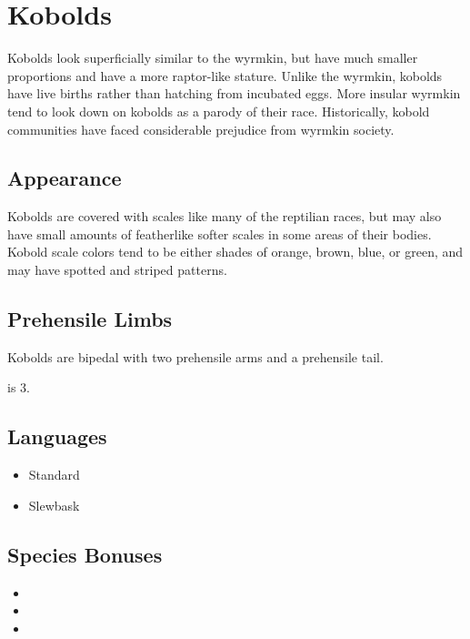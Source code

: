 {\GRPpagebreak
\section{Kobolds}

Kobolds look superficially similar to the wyrmkin, but have much smaller proportions and have a more raptor-like stature. Unlike the wyrmkin, kobolds have live births rather than hatching from incubated eggs. More insular wyrmkin tend to look down on kobolds as a parody of their race. Historically, kobold communities have faced considerable prejudice from wyrmkin society.

\subsection*{Appearance}

Kobolds are covered with scales like many of the reptilian races, but may also have small amounts of featherlike softer scales in some areas of their bodies. Kobold scale colors tend to be either shades of orange, brown, blue, or green, and may have spotted and striped patterns.

\subsection*{Prehensile Limbs}

Kobolds are bipedal with two prehensile arms and a prehensile tail.

 is 3.

\subsection*{Languages}

\begin{itemize}
	\item Standard
	\item Slewbask
\end{itemize}

\subsection*{Species Bonuses}

\begin{itemize}
	\item {}
	\item {}
	\item {}
\end{itemize}

}
